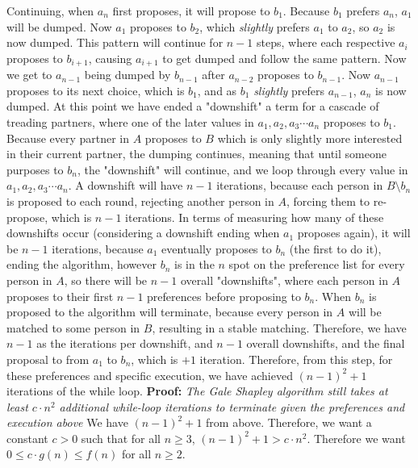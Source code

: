 \documentclass{article}
\begin{document}
Continuing, when $a_n$ first proposes, it will propose to $b_1$. Because $b_1$ prefers $a_n$, $a_1$ will be dumped. Now $a_1$ proposes to $b_2$, which \textit{slightly} prefers $a_1$ to $a_2$, so $a_2$ is now dumped. This pattern will continue for $n-1$ steps, where each respective $a_i$ proposes to $b_{i+1}$, causing $a_{i+1}$ to get dumped and follow the same pattern. Now we get to $a_{n-1}$ being dumped by $b_{n-1}$ after $a_{n-2}$ proposes to $b_{n-1}$. Now $a_{n-1}$ proposes to its next choice, which is $b_1$, and as $b_1$ \textit{slightly} prefers $a_{n-1}$, $a_n$ is now dumped. At this point we have ended a "downshift" a term for a cascade of treading partners, where one of the later values in $a_1,a_2, a_3 \cdots a_n$ proposes to $b_1$. Because every partner in $A$ proposes to $B$ which is only slightly more interested in their current partner, the dumping continues, meaning that until someone purposes to $b_n$, the "downshift" will continue, and we loop through every value in $a_1,a_2, a_3 \cdots a_n$. A downshift will have $n-1$ iterations, because each person in $B \setminus b_n$ is proposed to each round, rejecting another person in $A$, forcing them to re-propose, which is $n-1$ iterations. In terms of measuring how many of these downshifts occur (considering a downshift ending when $a_1$ proposes again), it will be $n-1$ iterations, because $a_1$ eventually proposes to $b_n$ (the first to do it), ending the algorithm, however $b_n$ is in the $n$ spot on the preference list for every person in $A$, so there will be $n-1$ overall "downshifts", where each person in $A$ proposes to their first $n-1$ preferences before proposing to $b_n$. When $b_n$ is proposed to the algorithm will terminate, because every person in $A$ will be matched to some person in $B$, resulting in a stable matching. Therefore, we have $n-1$ as the iterations per downshift, and $n-1$ overall downshifts, and the final proposal to from $a_1$ to $b_n$, which is $+1$ iteration. Therefore, from this step, for these preferences and specific execution, we have achieved $(n-1)^2 +1$ iterations of the while loop. \newline \newline 
\textbf{Proof:} \textit{The Gale Shapley algorithm still takes at least $c \cdot n^2$ additional while-loop iterations to terminate given the preferences and execution above} \newline
We have $(n-1)^2 +1$ from above. Therefore, we want a constant $c>0$ such that for all $n \geq 3$, $(n-1)^2 +1>c \cdot n^2$. Therefore we want $0 \leq c \cdot g(n) \leq  f(n)$ for all $n \geq 2$. \newline
\end{document}
